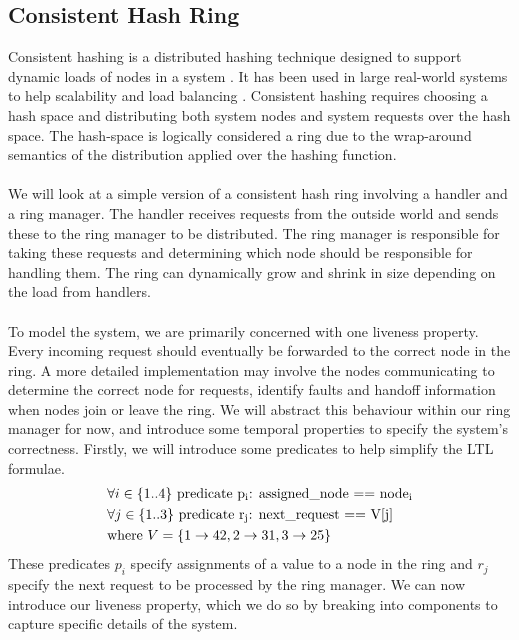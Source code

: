 \subsection{Consistent Hash Ring}
Consistent hashing is a distributed hashing technique designed to support dynamic loads of nodes in a system \cite{consistent_hash}. It has been used in large real-world systems to help scalability and load balancing \cite{dynamo}. Consistent hashing requires choosing a hash space and distributing both system nodes and system requests over the hash space. The hash-space is logically considered a ring due to the wrap-around semantics of the distribution applied over the hashing function.
\\ \\
We will look at a simple version of a consistent hash ring involving a handler and a ring manager. The handler receives requests from the outside world and sends these to the ring manager to be distributed. The ring manager is responsible for taking these requests and determining which node should be responsible for handling them. The ring can dynamically grow and shrink in size depending on the load from handlers.
\\ \\
To model the system, we are primarily concerned with one liveness property. Every incoming request should eventually be forwarded to the correct node in the ring. A more detailed implementation may involve the nodes communicating to determine the correct node for requests, identify faults and handoff information when nodes join or leave the ring. We will abstract this behaviour within our ring manager for now, and introduce some temporal properties to specify the system's correctness. Firstly, we will introduce some predicates to help simplify the LTL formulae.
\[
    \begin{aligned}
    & \forall i \in \{1..4\} \ \text{predicate p\textsubscript{i}: assigned\_node == node\textsubscript{i}} \\
    & \forall j \in \{1..3\} \ \text{predicate r\textsubscript{j}: next\_request == V[j]} \\
    & \text{where } V = \{1 \rightarrow 42, 2 \rightarrow 31, 3 \rightarrow 25\}
    \end{aligned}
\]
These predicates $p_i$ specify assignments of a value to a node in the ring and $r_j$ specify the next request to be processed by the ring manager. We can now introduce our liveness property, which we do so by breaking into components to capture specific details of the system.

